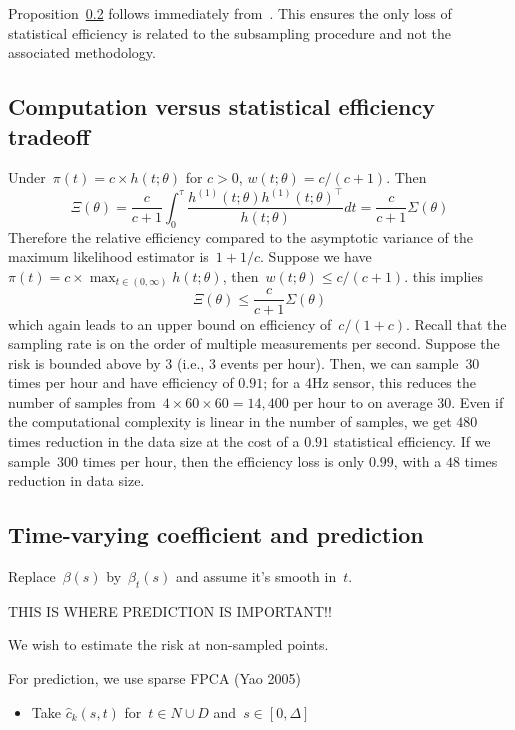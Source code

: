 \documentclass[11pt]{amsart}
\begin{document}
Proposition~\ref{} follows immediately from~\cite{Rathbun2013}.
This ensures the only loss of statistical efficiency is related to the 
subsampling procedure and not the associated methodology.

\subsection{Computation versus statistical efficiency tradeoff}

Under~$\pi(t) = c \times h(t; \theta)$ for $c>0$,
$w(t; \theta) = c/(c+1)$.  Then
\[
\Xi (\theta) = \frac{c}{c+1} \int_0^\tau \frac{ h^{(1)} (t; \theta)
  h^{(1)} (t; \theta)^\top}{h (t; \theta)} dt = \frac{c}{c+1} \Sigma (\theta)
\]
Therefore the relative efficiency compared to the asymptotic variance
of the maximum likelihood estimator is~$1 + 1/c$.
Suppose we have~$\pi (t) = c \times \max_{t \in (0,\infty)} h(t;
\theta)$, then~$w(t;\theta) \leq c/(c+1)$.  this implies
\[
\Xi (\theta) \leq \frac{c}{c+1} \Sigma(\theta)
\]
which again leads to an upper bound on efficiency of~$c/(1+c)$.
Recall that the sampling rate is on the order of multiple measurements
per second.  Suppose the risk is bounded above by $3$ (i.e., $3$ 
events per hour). Then, we can sample~$30$ times per hour and have
efficiency of $0.91$; for a 4Hz sensor, this reduces the number of
samples from~$4 \times 60 \times 60 = 14,400$ per hour to on average
$30$.  Even if the computational complexity is linear in the number of
samples, we get $480$ times reduction in the data size at the cost of
a $0.91$ statistical efficiency. 
If we sample~$300$ times per hour, then the efficiency loss is only
$0.99$, with a $48$ times reduction in data size.

\subsection{Time-varying coefficient and prediction}

Replace~$\beta(s)$ by~$\beta_t (s)$ and assume it's smooth in~$t$.

THIS IS WHERE PREDICTION IS IMPORTANT!!

We wish to estimate the risk at non-sampled points.

For prediction, we use sparse FPCA (Yao 2005) 
\begin{itemize}
\item Take $\hat c_{k} (s,t)$ for~$t \in N \cup D$ and~$s \in
  [0,\Delta]$
\end{itemize}
\end{document}
